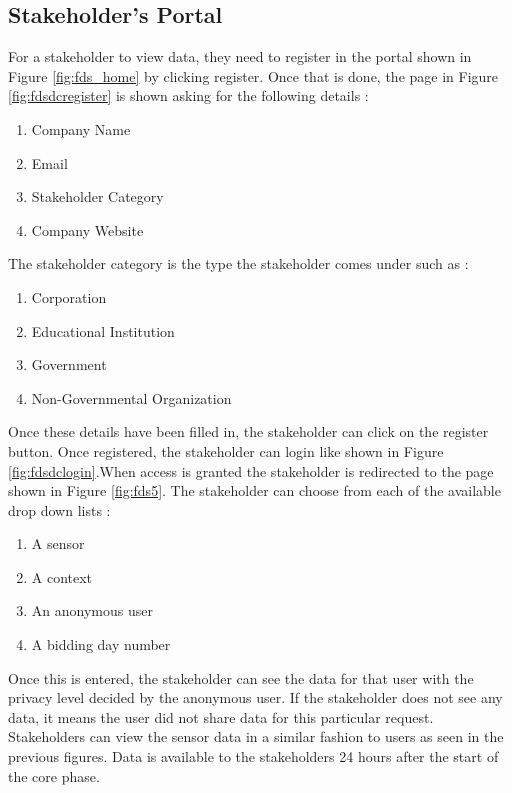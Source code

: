 \subsection{Stakeholder's Portal}

For a stakeholder to view data, they need to register in the portal shown in Figure \ref{fig:fds_home} by clicking register. Once that is done,
the page in Figure \ref{fig:fdsdcregister} is shown asking for the following details :

\begin{enumerate}
    \item Company Name
    \item Email
    \item Stakeholder Category
    \item Company Website
\end{enumerate}

The stakeholder category is the type the stakeholder comes under such as :

\begin{enumerate}
    \item Corporation
    \item Educational Institution
    \item Government
    \item Non-Governmental Organization
\end{enumerate}

Once these details have been filled in, the stakeholder can click on the register button. Once registered, the stakeholder can login like shown in Figure \ref{fig:fdsdclogin}.When access is granted the stakeholder is redirected to the page shown in Figure \ref{fig:fds5}. The stakeholder can choose from each of the available drop down lists :

\begin{enumerate}
    \item A sensor
    \item A context
    \item An anonymous user
    \item A bidding day number
\end{enumerate}

Once this is entered, the stakeholder can see the  data for that user with the privacy level decided by the anonymous user. If the stakeholder does not see any data, it means the user did not share data for this particular request. Stakeholders can view the sensor data in a similar fashion to users as seen in the previous figures. Data is available to the stakeholders 24 hours after the start of the core phase.


